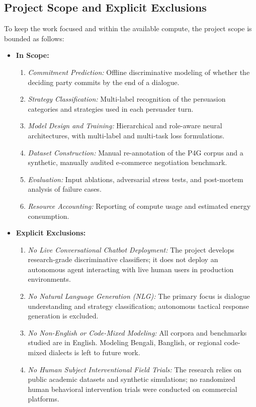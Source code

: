 \subsection{Project Scope and Explicit Exclusions}
To keep the work focused and within the available compute, the project scope is bounded as follows:

\begin{keypoint}
\begin{itemize}
  \item \textbf{In Scope:}
    \begin{enumerate}
      \item \textit{Commitment Prediction:} Offline discriminative modeling of whether the deciding party commits by the end of a dialogue.
      \item \textit{Strategy Classification:} Multi-label recognition of the persuasion categories and strategies used in each persuader turn.
      \item \textit{Model Design and Training:} Hierarchical and role-aware neural architectures, with multi-label and multi-task loss formulations.
      \item \textit{Dataset Construction:} Manual re-annotation of the P4G corpus and a synthetic, manually audited e-commerce negotiation benchmark.
      \item \textit{Evaluation:} Input ablations, adversarial stress tests, and post-mortem analysis of failure cases.
      \item \textit{Resource Accounting:} Reporting of compute usage and estimated energy consumption.
    \end{enumerate}
  \item \textbf{Explicit Exclusions:}
    \begin{enumerate}
      \item \textit{No Live Conversational Chatbot Deployment:} The project develops research-grade discriminative classifiers; it does not deploy an autonomous agent interacting with live human users in production environments.
      \item \textit{No Natural Language Generation (NLG):} The primary focus is dialogue understanding and strategy classification; autonomous tactical response generation is excluded.
      \item \textit{No Non-English or Code-Mixed Modeling:} All corpora and benchmarks studied are in English. Modeling Bengali, Banglish, or regional code-mixed dialects is left to future work.
      \item \textit{No Human Subject Interventional Field Trials:} The research relies on public academic datasets and synthetic simulations; no randomized human behavioral intervention trials were conducted on commercial platforms.
    \end{enumerate}
\end{itemize}
\end{keypoint}
